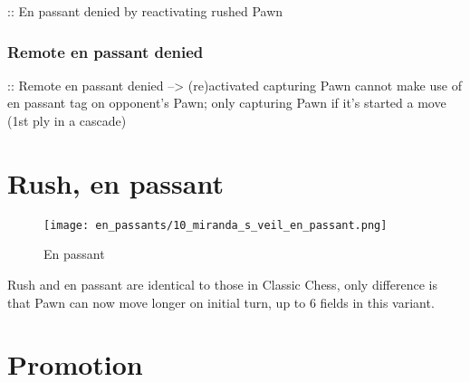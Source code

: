 \vspace*{12.7\baselineskip}
\TODO :: En passant denied by reactivating rushed Pawn

\clearpage %

\subsubsection*{Remote en passant denied}
\label{sec:Miranda's veil/Wave/En passant/Remote en passant denied}

\TODO :: Remote en passant denied --> (re)activated capturing Pawn cannot make use of en passant tag on opponent's Pawn; only capturing Pawn if it's started a move (1st ply in a cascade)

\clearpage %

\section*{Rush, en passant}
\label{sec:Miranda's veil/Rush, en passant}

\noindent
\begin{wrapfigure}[5]{l}{0.4\textwidth}
\centering
\texttt{[image: en\_passants/10\_miranda\_s\_veil\_en\_passant.png]}
\caption{En passant}
\label{fig:10_miranda_s_veil_en_passant}
\end{wrapfigure}
Rush and en passant are identical to those in Classic Chess, only difference
is that Pawn can now move longer on initial turn, up to 6 fields in this
variant.


\vspace*{9.0\baselineskip}
\section*{Promotion}
\label{sec:Miranda's veil/Promotion}

